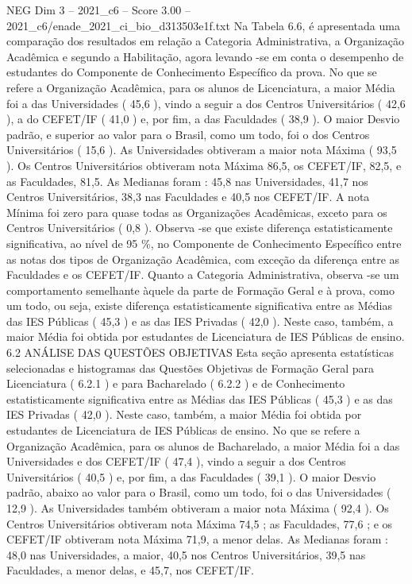 \begin{textsample}{NEG Dim 3 – 2021\_c6 – Score 3.00 – 2021\_c6/enade\_2021\_ci\_bio\_d313503e1f.txt}
Na Tabela 6.6, é apresentada uma comparação dos resultados em relação a Categoria Administrativa, a Organização Acadêmica e segundo a Habilitação, agora levando -se em conta o desempenho de estudantes do Componente de Conhecimento Específico da prova.
No que se refere a Organização Acadêmica, para os alunos de Licenciatura, a maior Média foi a das Universidades ( 45,6 ), vindo a seguir a dos Centros Universitários ( 42,6 ), a do CEFET/IF ( 41,0 ) e, por fim, a das Faculdades ( 38,9 ).
O maior Desvio padrão, e superior ao valor para o Brasil, como um todo, foi o dos Centros Universitários ( 15,6 ).
As Universidades obtiveram a maior nota Máxima ( 93,5 ).
Os Centros Universitários obtiveram nota Máxima 86,5, os CEFET/IF, 82,5, e as Faculdades, 81,5.
As Medianas foram : 45,8 nas Universidades, 41,7 nos Centros Universitários, 38,3 nas Faculdades e 40,5 nos CEFET/IF.
A nota Mínima foi zero para quase todas as Organizações Acadêmicas, exceto para os Centros Universitários ( 0,8 ).
Observa -se que existe diferença estatisticamente significativa, ao nível de 95 \%, no Componente de Conhecimento Específico entre as notas dos tipos de Organização Acadêmica, com exceção da diferença entre as Faculdades e os CEFET/IF.
Quanto a Categoria Administrativa, observa -se um comportamento semelhante àquele da parte de Formação Geral e à prova, como um todo, ou seja, existe diferença estatisticamente significativa entre as Médias das IES Públicas ( 45,3 ) e as das IES Privadas ( 42,0 ).
Neste caso, também, a maior Média foi obtida por estudantes de Licenciatura de IES Públicas de ensino. 6.2 ANÁLISE DAS QUESTÕES OBJETIVAS Esta seção apresenta estatísticas selecionadas e histogramas das Questões Objetivas de Formação Geral para Licenciatura ( 6.2.1 ) e para Bacharelado ( 6.2.2 ) e de Conhecimento estatisticamente significativa entre as Médias das IES Públicas ( 45,3 ) e as das IES Privadas ( 42,0 ).
Neste caso, também, a maior Média foi obtida por estudantes de Licenciatura de IES Públicas de ensino.
No que se refere a Organização Acadêmica, para os alunos de Bacharelado, a maior Média foi a das Universidades e dos CEFET/IF ( 47,4 ), vindo a seguir a dos Centros Universitários ( 40,5 ) e, por fim, a das Faculdades ( 39,1 ).
O maior Desvio padrão, abaixo ao valor para o Brasil, como um todo, foi o das Universidades ( 12,9 ).
As Universidades também obtiveram a maior nota Máxima ( 92,4 ).
Os Centros Universitários obtiveram nota Máxima 74,5 ; as Faculdades, 77,6 ; e os CEFET/IF obtiveram nota Máxima 71,9, a menor delas.
As Medianas foram : 48,0 nas Universidades, a maior, 40,5 nos Centros Universitários, 39,5 nas Faculdades, a menor delas, e 45,7, nos CEFET/IF.

\end{textsample}
